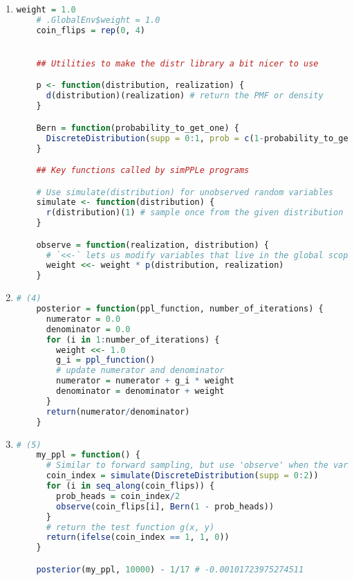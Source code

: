 \documentclass{article}
\begin{document}
\begin{enumerate}
  \item 
  \begin{lstlisting}[language=R]
    weight = 1.0
    # .GlobalEnv$weight = 1.0
    coin_flips = rep(0, 4)


    ## Utilities to make the distr library a bit nicer to use

    p <- function(distribution, realization) {
      d(distribution)(realization) # return the PMF or density 
    }

    Bern = function(probability_to_get_one) {
      DiscreteDistribution(supp = 0:1, prob = c(1-probability_to_get_one, probability_to_get_one))
    }

    ## Key functions called by simPPLe programs

    # Use simulate(distribution) for unobserved random variables
    simulate <- function(distribution) {
      r(distribution)(1) # sample once from the given distribution
    }

    observe = function(realization, distribution) {
      # `<<-` lets us modify variables that live in the global scope from inside a function
      weight <<- weight * p(distribution, realization) 
    }   
  \end{lstlisting}


  \item 
  \begin{lstlisting}[language=R]
    # (4)
    posterior = function(ppl_function, number_of_iterations) {
      numerator = 0.0
      denominator = 0.0
      for (i in 1:number_of_iterations) {
        weight <<- 1.0
        g_i = ppl_function()
        # update numerator and denominator
        numerator = numerator + g_i * weight
        denominator = denominator + weight
      }
      return(numerator/denominator)
    }
  \end{lstlisting}

  \item 
  \begin{lstlisting}[language=R]
    # (5)
    my_ppl = function() {
      # Similar to forward sampling, but use 'observe' when the variable is observed
      coin_index = simulate(DiscreteDistribution(supp = 0:2))
      for (i in seq_along(coin_flips)) { 
        prob_heads = coin_index/2
        observe(coin_flips[i], Bern(1 - prob_heads)) 
      }
      # return the test function g(x, y)
      return(ifelse(coin_index == 1, 1, 0))
    }

    posterior(my_ppl, 10000) - 1/17 # -0.00101723975274511
  \end{lstlisting}
\end{enumerate}











 
\end{document}
